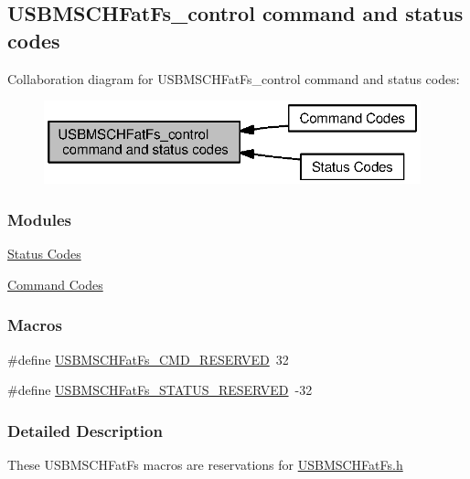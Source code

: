 \subsection{U\+S\+B\+M\+S\+C\+H\+Fat\+Fs\+\_\+control command and status codes}
\label{group___u_s_b_m_s_c_h_fat_fs___c_o_n_t_r_o_l}
Collaboration diagram for U\+S\+B\+M\+S\+C\+H\+Fat\+Fs\+\_\+control command and status codes\+:
\nopagebreak
\begin{figure}[H]
\begin{center}
\leavevmode
\includegraphics[width=309pt]{group___u_s_b_m_s_c_h_fat_fs___c_o_n_t_r_o_l}
\end{center}
\end{figure}
\subsubsection*{Modules}
\begin{DoxyCompactItemize}
\item 
\hyperlink{group___u_s_b_m_s_c_h_fat_fs___s_t_a_t_u_s}{Status Codes}
\item 
\hyperlink{group___u_s_b_m_s_c_h_fat_fs___c_m_d}{Command Codes}
\end{DoxyCompactItemize}
\subsubsection*{Macros}
\begin{DoxyCompactItemize}
\item 
\#define \hyperlink{group___u_s_b_m_s_c_h_fat_fs___c_o_n_t_r_o_l_gad004ac61340295d4d9b03cf1c2e202c4}{U\+S\+B\+M\+S\+C\+H\+Fat\+Fs\+\_\+\+C\+M\+D\+\_\+\+R\+E\+S\+E\+R\+V\+E\+D}~32
\item 
\#define \hyperlink{group___u_s_b_m_s_c_h_fat_fs___c_o_n_t_r_o_l_ga545b1522b0f10d6215484ade86b5dcc8}{U\+S\+B\+M\+S\+C\+H\+Fat\+Fs\+\_\+\+S\+T\+A\+T\+U\+S\+\_\+\+R\+E\+S\+E\+R\+V\+E\+D}~-\/32
\end{DoxyCompactItemize}


\subsubsection{Detailed Description}
These U\+S\+B\+M\+S\+C\+H\+Fat\+Fs macros are reservations for \hyperlink{_u_s_b_m_s_c_h_fat_fs_8h}{U\+S\+B\+M\+S\+C\+H\+Fat\+Fs.\+h} 

